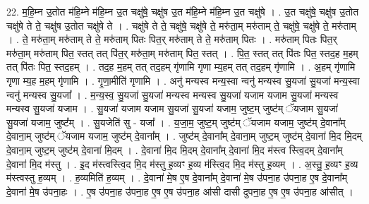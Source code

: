 \documentclass[17pt]{extarticle}
\begin{document}
22. म॒हि॒म्न उ॒तोत म॑हि॒म्ने म॑हि॒म्न उ॒त चक्षु॑षे॒ चक्षु॑ष उ॒त म॑हि॒म्ने म॑हि॒म्न उ॒त चक्षु॑षे । . उ॒त चक्षु॑षे॒ चक्षु॑ष उ॒तोत चक्षु॑षे ते ते॒ चक्षु॑ष उ॒तोत चक्षु॑षे ते । . चक्षु॑षे ते ते॒ चक्षु॑षे॒ चक्षु॑षे ते॒ मरु॑ता॒म् मरु॑ताम् ते॒ चक्षु॑षे॒ चक्षु॑षे ते॒ मरु॑ताम् । . ते॒ मरु॑ता॒म् मरु॑ताम् ते ते॒ मरु॑ताम् पितः पित॒र् मरु॑ताम् ते ते॒ मरु॑ताम् पितः । . मरु॑ताम् पितः पित॒र् मरु॑ता॒म् मरु॑ताम् पित॒ स्तत् तत् पि॑त॒र् मरु॑ता॒म् मरु॑ताम् पित॒ स्तत् । . पि॒त॒ स्तत् तत् पि॑तः पित॒ स्तद॒ह म॒हम् तत् पि॑तः पित॒ स्तद॒हम् । . तद॒ह म॒हम् तत् तद॒हम् गृ॑णामि गृणा म्य॒हम् तत् तद॒हम् गृ॑णामि । . अ॒हम् गृ॑णामि गृणा म्य॒ह म॒हम् गृ॑णामि । . गृ॒णा॒मीति॑ गृणामि । . अनु॑ मन्यस्व मन्य॒स्वा न्वनु॑ मन्यस्व सु॒यजा॑ सु॒यजा॑ मन्य॒स्वा न्वनु॑ मन्यस्व सु॒यजा᳚ । . म॒न्य॒स्व॒ सु॒यजा॑ सु॒यजा॑ मन्यस्व मन्यस्व सु॒यजा॑ यजाम यजाम सु॒यजा॑ मन्यस्व मन्यस्व सु॒यजा॑ यजाम । . सु॒यजा॑ यजाम यजाम सु॒यजा॑ सु॒यजा॑ यजाम॒ जुष्ट॒म् जुष्ट॑म् ॅयजाम सु॒यजा॑ सु॒यजा॑ यजाम॒ जुष्ट᳚म् । . सु॒यजेति॑ सु - यजा᳚ । . य॒जा॒म॒ जुष्ट॒म् जुष्ट॑म् ॅयजाम यजाम॒ जुष्ट॑म् दे॒वाना᳚म् दे॒वाना॒म् जुष्ट॑म् ॅयजाम यजाम॒ जुष्ट॑म् दे॒वाना᳚म् । . जुष्ट॑म् दे॒वाना᳚म् दे॒वाना॒म् जुष्ट॒म् जुष्ट॑म् दे॒वाना॑ मि॒द मि॒दम् दे॒वाना॒म् जुष्ट॒म् जुष्ट॑म् दे॒वाना॑ मि॒दम् । . दे॒वाना॑ मि॒द मि॒दम् दे॒वाना᳚म् दे॒वाना॑ मि॒द म॑स्त्व स्त्वि॒दम् दे॒वाना᳚म् दे॒वाना॑ मि॒द म॑स्तु । . इ॒द म॑स्त्वस्त्वि॒द मि॒द म॑स्तु ह॒व्यꣳ ह॒व्य म॑स्त्वि॒द मि॒द म॑स्तु ह॒व्यम् । . अ॒स्तु॒ ह॒व्यꣳ ह॒व्य म॑स्त्वस्तु ह॒व्यम् । . ह॒व्यमिति॑ ह॒व्यम् । . दे॒वाना॑ मे॒ष ए॒ष दे॒वाना᳚म् दे॒वाना॑ मे॒ष उ॑पना॒ह उ॑पना॒ह ए॒ष दे॒वाना᳚म् दे॒वाना॑ मे॒ष उ॑पना॒हः । . ए॒ष उ॑पना॒ह उ॑पना॒ह ए॒ष ए॒ष उ॑पना॒ह आ॑सी दासी दुपना॒ह ए॒ष ए॒ष उ॑पना॒ह आ॑सीत् । \newline
\end{document}
